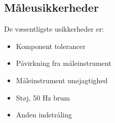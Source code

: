 \subsection*{Måleusikkerheder}
\label{maalejournal_maaleusikkerheder}
De væsentligste usikkerheder er:
\begin{itemize}
\item Komponent tolerancer
\item Påvirkning fra måleinstrument
\item Måleinstrument unøjagtighed
\item Støj, 50 Hz brum
\item Anden indstråling
\end{itemize}